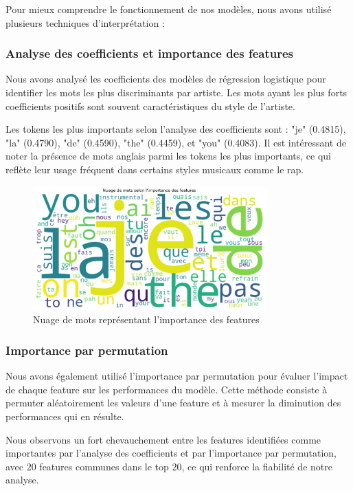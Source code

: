 \documentclass[a4paper,11pt]{article}
\begin{document}
Pour mieux comprendre le fonctionnement de nos modèles, nous avons utilisé plusieurs techniques d'interprétation :

\subsubsection{Analyse des coefficients et importance des features}
Nous avons analysé les coefficients des modèles de régression logistique pour identifier les mots les plus discriminants par artiste. Les mots ayant les plus forts coefficients positifs sont souvent caractéristiques du style de l'artiste.

Les tokens les plus importants selon l'analyse des coefficients sont : "je" (0.4815), "la" (0.4790), "de" (0.4590), "the" (0.4459), et "you" (0.4083). Il est intéressant de noter la présence de mots anglais parmi les tokens les plus importants, ce qui reflète leur usage fréquent dans certains styles musicaux comme le rap.

\begin{figure}[ht]
    \centering
    \includegraphics[width=0.8\textwidth]{results_rapport/feature_importance_wordcloud.png}
    \caption{Nuage de mots représentant l'importance des features}
    \label{fig:feature-importance}
\end{figure}

\subsubsection{Importance par permutation}
Nous avons également utilisé l'importance par permutation pour évaluer l'impact de chaque feature sur les performances du modèle. Cette méthode consiste à permuter aléatoirement les valeurs d'une feature et à mesurer la diminution des performances qui en résulte.

Nous observons un fort chevauchement entre les features identifiées comme importantes par l'analyse des coefficients et par l'importance par permutation, avec 20 features communes dans le top 20, ce qui renforce la fiabilité de notre analyse.
\end{document}
